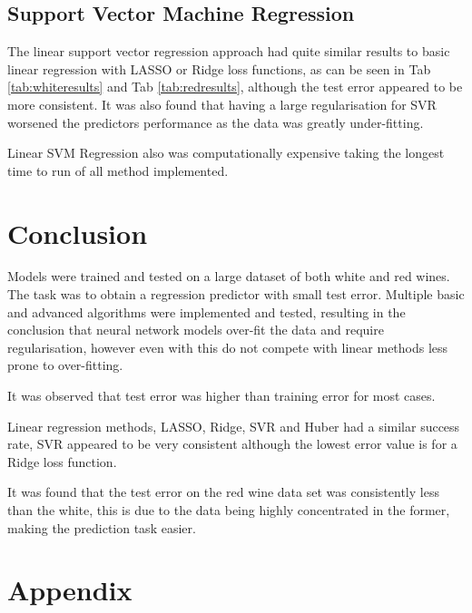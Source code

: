 \documentclass[10pt,twocolumn,letterpaper]{article}
\begin{document}
\subsection{Support Vector Machine Regression}
The linear support vector regression approach had quite similar results to basic linear regression with LASSO or Ridge loss functions, as can be seen in Tab \ref{tab:whiteresults} and Tab \ref{tab:redresults}, although the test error appeared to be more consistent. It was also found that having a large regularisation for SVR worsened the predictors performance as the data was greatly under-fitting.

Linear SVM Regression also was computationally expensive taking the longest time to run of all method implemented.

\section{Conclusion}
Models were trained and tested on a large dataset of both white and red wines. The task was to obtain a regression predictor with small test error. Multiple basic and advanced algorithms were implemented and tested, resulting in the conclusion that neural network models over-fit the data and require regularisation, however even with this do not compete with linear methods less prone to over-fitting. 

It was observed that test error was higher than training error for most cases.

Linear regression methods, LASSO, Ridge, SVR and Huber had a similar success rate, SVR appeared to be very consistent although the lowest error value is for a Ridge loss function.

It was found that the test error on the red wine data set was consistently less than the white, this is due to the data being highly concentrated in the former, making the prediction task easier.

{\small
	
	
}


\section{Appendix}
\end{document}
